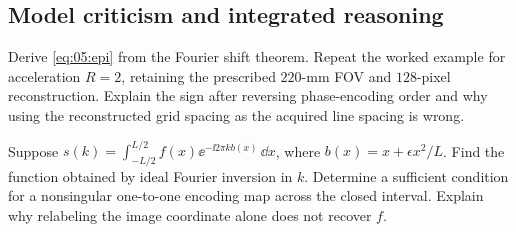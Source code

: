 \subsection{Model criticism and integrated reasoning}
\begin{challengeproblem}\label{prob:05:epi}
Derive \cref{eq:05:epi} from the Fourier shift theorem. Repeat the worked example for acceleration \(R=2\), retaining the prescribed \(220\)-mm FOV and \(128\)-pixel reconstruction.
Explain the sign after reversing phase-encoding order and why using the reconstructed grid spacing as the acquired line spacing is wrong.
\end{challengeproblem}
\begin{challengeproblem}\label{prob:05:nonlinear}
Suppose \(s(k)=\int_{-L/2}^{L/2}f(x)\ee^{-\ii2\pi k b(x)}\,\dd x\), where \(b(x)=x+\epsilon x^2/L\).
Find the function obtained by ideal Fourier inversion in \(k\). Determine a sufficient condition for a nonsingular one-to-one encoding map across the closed interval.
Explain why relabeling the image coordinate alone does not recover \(f\).
\end{challengeproblem}
